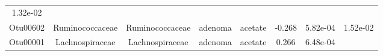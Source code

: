 \documentclass[11pt,]{article}
\begin{document}
\begin{longtable}[]{@{}cccccccc@{}}
\begin{minipage}[t]{0.08\columnwidth}
1.32e-02\strut
\end{minipage}\tabularnewline
\begin{minipage}[t]{0.08\columnwidth}\centering\strut
Otu00602\strut
\end{minipage} & \begin{minipage}[t]{0.15\columnwidth}\centering\strut
Ruminococcaceae\strut
\end{minipage} & \begin{minipage}[t]{0.15\columnwidth}\centering\strut
Ruminococcaceae\strut
\end{minipage} & \begin{minipage}[t]{0.08\columnwidth}\centering\strut
adenoma\strut
\end{minipage} & \begin{minipage}[t]{0.09\columnwidth}\centering\strut
acetate\strut
\end{minipage} & \begin{minipage}[t]{0.07\columnwidth}\centering\strut
-0.268\strut
\end{minipage} & \begin{minipage}[t]{0.08\columnwidth}\centering\strut
5.82e-04\strut
\end{minipage} & \begin{minipage}[t]{0.08\columnwidth}\centering\strut
1.52e-02\strut
\end{minipage}\tabularnewline
\begin{minipage}[t]{0.08\columnwidth}\centering\strut
Otu00001\strut
\end{minipage} & \begin{minipage}[t]{0.15\columnwidth}\centering\strut
Lachnospiraceae\strut
\end{minipage} & \begin{minipage}[t]{0.15\columnwidth}\centering\strut
Lachnospiraceae\strut
\end{minipage} & \begin{minipage}[t]{0.08\columnwidth}\centering\strut
adenoma\strut
\end{minipage} & \begin{minipage}[t]{0.09\columnwidth}\centering\strut
acetate\strut
\end{minipage} & \begin{minipage}[t]{0.07\columnwidth}\centering\strut
0.266\strut
\end{minipage} & \begin{minipage}[t]{0.08\columnwidth}\centering\strut
6.48e-04\strut
\end{minipage} & \begin{minipage}[t]{0.08\columnwidth}\centering\strut

\end{minipage}
\end{longtable}
\end{document}
